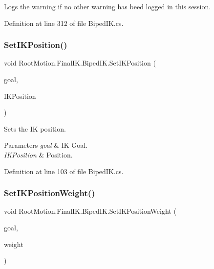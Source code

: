 Logs the warning if no other warning has beed logged in this session. 



Definition at line 312 of file Biped\+I\+K.\+cs.

\mbox{\label{class_root_motion_1_1_final_i_k_1_1_biped_i_k_afea423e263633adfafa19b2d117c98d2}} 
\subsubsection{\texorpdfstring{Set\+I\+K\+Position()}{SetIKPosition()}}
{\footnotesize\ttfamily void Root\+Motion.\+Final\+I\+K.\+Biped\+I\+K.\+Set\+I\+K\+Position (\begin{DoxyParamCaption}\item[{Avatar\+I\+K\+Goal}]{goal,  }\item[{Vector3}]{I\+K\+Position }\end{DoxyParamCaption})}



Sets the IK position. 


\begin{DoxyParams}{Parameters}
{\em goal} & IK Goal. \\
\hline
{\em I\+K\+Position} & Position. \\
\hline
\end{DoxyParams}


Definition at line 103 of file Biped\+I\+K.\+cs.

\mbox{\label{class_root_motion_1_1_final_i_k_1_1_biped_i_k_ab538d036986a562103396d59672296da}} 
\subsubsection{\texorpdfstring{Set\+I\+K\+Position\+Weight()}{SetIKPositionWeight()}}
{\footnotesize\ttfamily void Root\+Motion.\+Final\+I\+K.\+Biped\+I\+K.\+Set\+I\+K\+Position\+Weight (\begin{DoxyParamCaption}\item[{Avatar\+I\+K\+Goal}]{goal,  }\item[{float}]{weight }\end{DoxyParamCaption})}



